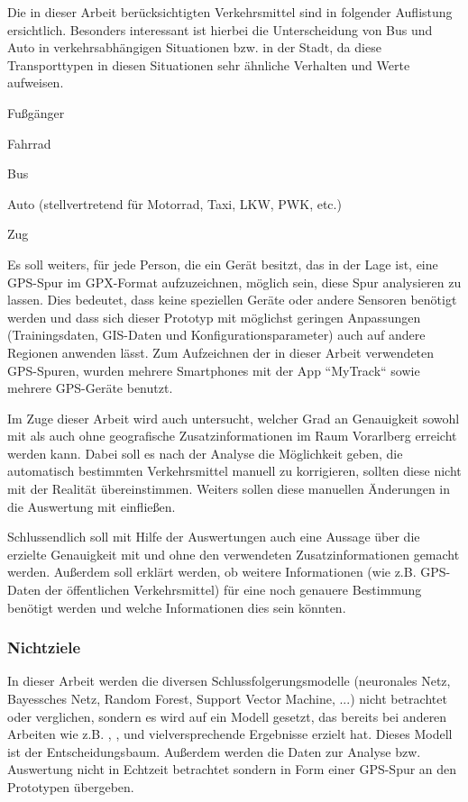 Die in dieser Arbeit berücksichtigten Verkehrsmittel sind in folgender Auflistung ersichtlich. Besonders interessant ist hierbei die Unterscheidung von Bus und Auto in verkehrsabhängigen Situationen bzw. in der Stadt, da diese Transporttypen in diesen Situationen sehr ähnliche Verhalten und Werte aufweisen. 

\begin{pitemize}
\item Fußgänger
\item Fahrrad
\item Bus
\item Auto (stellvertretend für Motorrad, Taxi, LKW, PWK, etc.)
\item Zug
\end{pitemize}

Es soll weiters, für jede Person, die ein Gerät besitzt, das in der Lage ist, eine GPS-Spur im GPX-Format aufzuzeichnen, möglich sein, diese Spur analysieren zu lassen. Dies bedeutet, dass keine speziellen Geräte oder andere Sensoren benötigt werden und dass sich dieser Prototyp mit möglichst geringen Anpassungen (Trainingsdaten, GIS-Daten und Konfigurationsparameter) auch auf andere Regionen anwenden lässt. Zum Aufzeichnen der in dieser Arbeit verwendeten GPS-Spuren, wurden mehrere Smartphones mit der App ``MyTrack`` sowie mehrere GPS-Geräte benutzt.

Im Zuge dieser Arbeit wird auch untersucht, welcher Grad an Genauigkeit sowohl mit als auch ohne geografische Zusatzinformationen im Raum Vorarlberg erreicht werden kann. Dabei soll es nach der Analyse die Möglichkeit geben, die automatisch bestimmten Verkehrsmittel manuell zu korrigieren, sollten diese nicht mit der Realität übereinstimmen. Weiters sollen diese manuellen Änderungen in die Auswertung mit einfließen. 

Schlussendlich soll mit Hilfe der Auswertungen auch eine Aussage über die erzielte Genauigkeit mit und ohne den verwendeten Zusatzinformationen gemacht werden. Außerdem soll erklärt werden, ob weitere Informationen (wie z.B. GPS-Daten der öffentlichen Verkehrsmittel) für eine noch genauere Bestimmung benötigt werden und welche Informationen dies sein könnten. 

\subsubsection{Nichtziele}

In dieser Arbeit werden die diversen Schlussfolgerungsmodelle (neuronales Netz, Bayessches Netz, Random Forest, Support Vector Machine, ...) nicht betrachtet oder verglichen, sondern es wird auf ein Modell gesetzt, das bereits bei anderen Arbeiten wie z.B. \cite{stenneth_transportation_2011}, \cite{reddy_using_2010}, \cite{sebastian_nagel_moglichkeitsstudie_2011} und  \cite{zheng_learning_2008} vielversprechende Ergebnisse erzielt hat. Dieses Modell ist der Entscheidungsbaum. Außerdem werden die Daten zur Analyse bzw. Auswertung nicht in Echtzeit betrachtet sondern in Form einer GPS-Spur an den Prototypen übergeben.

